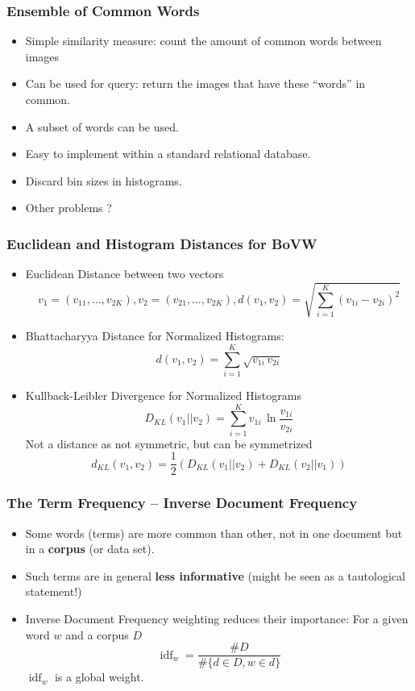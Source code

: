 \documentclass[10pt]{beamer}
\DeclareMathOperator{\idf}{idf}
\begin{document}
\begin{frame}
  \frametitle{Ensemble of Common Words}
  \begin{itemize}
  \item Simple similarity measure: count the amount of common words between images
  \item Can be used for query: return the images that have these ``words'' in common.
  \item A subset of words can be used.
  \item Easy to implement within a standard relational database. 
  \item Discard bin sizes in histograms.
  \item Other problems ? 
  \end{itemize}
\end{frame}


\begin{frame}
  \frametitle{Euclidean and Histogram Distances for BoVW}
  \begin{itemize}
  \item Euclidean Distance between two vectors 
    $$
    v_1 = \left(v_{11},\dots,v_{2K}\right), v_2 = \left(v_{21},\dots,v_{2K}\right), 
    d(v_1,v_2) = \sqrt{\sum_{i=1}^K\left(v_{1i}-v_{2i}\right)^2}
    $$
  \item Bhattacharyya Distance for Normalized Histograms:
    $$
    d(v_1,v_2) = \sum_{i=1}^K\sqrt{ v_{1i}\, v_{2i}}
    $$
  \item Kullback-Leibler Divergence for Normalized Histograms
    $$
    D_{KL}(v_1||v_2) = \sum_{i=1}^Kv_{1i}\,\ln\frac{v_{1i}}{v_{2i}}
    $$
    Not a distance as not symmetric, but can be symmetrized 
    $$
    d_{KL}\left(v_1,v_2\right) = \frac12\left( D_{KL}(v_1||v_2) +  D_{KL}(v_2||v_1)\right)
    $$
  \end{itemize}
\end{frame}


\begin{frame}
  \frametitle{The Term Frequency -- Inverse Document Frequency }
  \begin{itemize}
  \item Some words (terms) are more common than other, not in one document but in a \textbf{corpus} (or data set).
  \item Such terms are in general \textbf{less informative} (might be seen as a tautological statement!)
  \item Inverse Document Frequency weighting reduces their importance: For a given word $w$ and a corpus $D$
    $$
    \idf_w = \frac{\# D}{\#\{d\in D, w\in d\}} 
    $$
    $\idf_w$ is a global weight.
  \end{itemize}
\end{frame}
\end{document}
